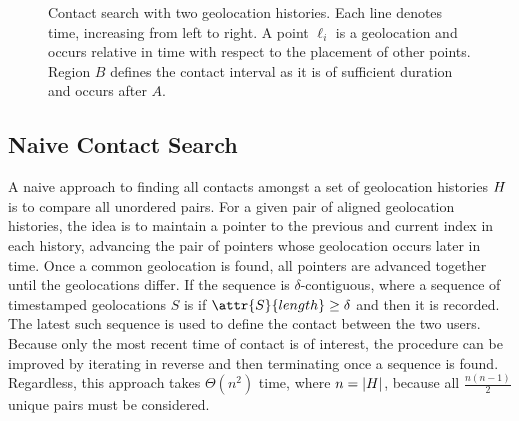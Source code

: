 \begin{figure}[htbp]
\centering
{}
\caption[Contact search with two geolocation histories]{Contact search with two geolocation histories. Each line denotes time, increasing from left to right. A point $\ell_i$ is a geolocation and occurs relative in time with respect to the placement of other points. Region $B$ defines the contact interval as it is of sufficient duration and occurs after $A$.}
\label{fig:contact-search}
\end{figure}

\subsection{Naive Contact Search}\label{sec:naive-contact-search}

A naive approach to finding all contacts amongst a set of geolocation histories $H$ is to compare all unordered pairs. For a given pair of aligned geolocation histories, the idea is to maintain a pointer to the previous and current index in each history, advancing the pair of pointers whose geolocation occurs later in time. Once a common geolocation is found, all pointers are advanced together until the geolocations differ. If the sequence is $\delta$-contiguous, where a sequence of timestamped geolocations $S$ is  if $\attr{S}{length} \geq \delta$ and
then it is recorded. The latest such sequence is used to define the contact between the two users. Because only the most recent time of contact is of interest, the procedure can be improved by iterating in reverse and then terminating once a sequence is found. Regardless, this approach takes $\Theta(n^2)$ time, where $n = \left\vert H \right\vert$, because all $\frac{n(n - 1)}{2}$ unique pairs must be considered.

